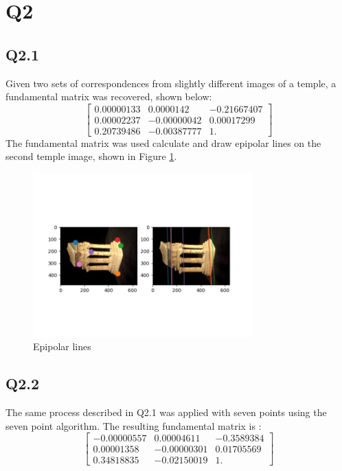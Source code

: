 \documentclass[12pt]{article}
\begin{document}
  
\newpage
\section{Q2}
\subsection{Q2.1}
Given two sets of correspondences from slightly different images of a temple, a fundamental matrix was recovered, shown below:
$$
\begin{bmatrix}
0.00000133  &  0.0000142  &  -0.21667407 \\
0.00002237  & -0.00000042 &  0.00017299 \\
0.20739486  & -0.00387777 &   1.         
\end{bmatrix}
$$
The fundamental matrix was used calculate and draw epipolar lines on the second temple image, shown in Figure \ref{fig:fepipolar}.

\begin{figure}[H]
\centering
\includegraphics[page=1,width=0.75\textwidth]{q2_1}
\caption{ Epipolar lines  } 
\label{fig:fepipolar}
\end{figure}   

\newpage
\subsection{Q2.2}


The same process described in Q2.1 was applied with seven points using the seven point algorithm. The resulting fundamental matrix is :
$$
\begin{bmatrix}
-0.00000557  &  0.00004611  & -0.3589384 \\
0.00001358   & -0.00000301  &  0.01705569 \\
0.34818835   & -0.02150019  &  1.        
\end{bmatrix}
$$
\end{document}
